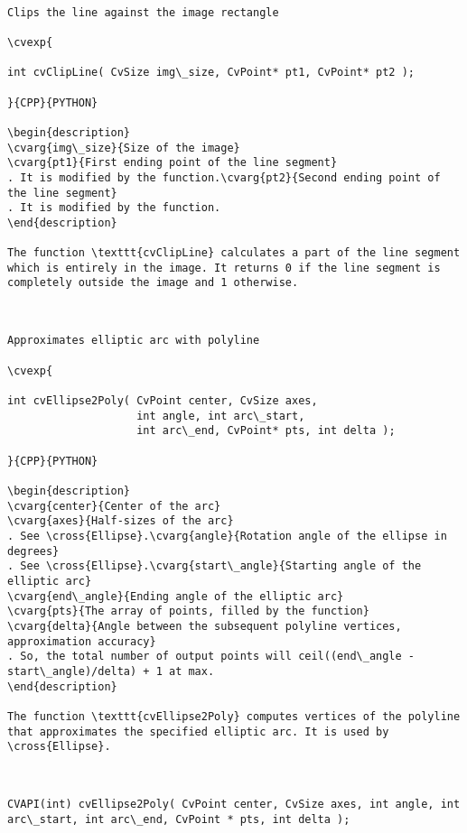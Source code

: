 \begin{verbatim}

Clips the line against the image rectangle

\cvexp{

int cvClipLine( CvSize img\_size, CvPoint* pt1, CvPoint* pt2 );

}{CPP}{PYTHON}

\begin{description}
\cvarg{img\_size}{Size of the image}
\cvarg{pt1}{First ending point of the line segment}
. It is modified by the function.\cvarg{pt2}{Second ending point of the line segment}
. It is modified by the function.
\end{description}

The function \texttt{cvClipLine} calculates a part of the line segment which is entirely in the image. It returns 0 if the line segment is completely outside the image and 1 otherwise.


\end{verbatim}
\begin{verbatim}

Approximates elliptic arc with polyline

\cvexp{

int cvEllipse2Poly( CvPoint center, CvSize axes,
                    int angle, int arc\_start,
                    int arc\_end, CvPoint* pts, int delta );

}{CPP}{PYTHON}

\begin{description}
\cvarg{center}{Center of the arc}
\cvarg{axes}{Half-sizes of the arc}
. See \cross{Ellipse}.\cvarg{angle}{Rotation angle of the ellipse in degrees}
. See \cross{Ellipse}.\cvarg{start\_angle}{Starting angle of the elliptic arc}
\cvarg{end\_angle}{Ending angle of the elliptic arc}
\cvarg{pts}{The array of points, filled by the function}
\cvarg{delta}{Angle between the subsequent polyline vertices, approximation accuracy}
. So, the total number of output points will ceil((end\_angle - start\_angle)/delta) + 1 at max.
\end{description}

The function \texttt{cvEllipse2Poly} computes vertices of the polyline that approximates the specified elliptic arc. It is used by \cross{Ellipse}.


\end{verbatim}
\begin{verbatim}

CVAPI(int) cvEllipse2Poly( CvPoint center, CvSize axes, int angle, int arc\_start, int arc\_end, CvPoint * pts, int delta );


\end{verbatim}
